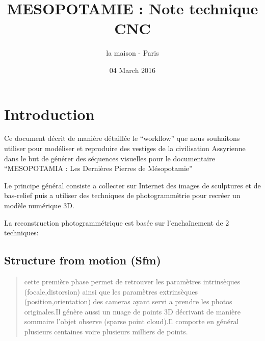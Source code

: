\documentclass[a4paper,10pt,french]{sphinxhowto}
\title{MESOPOTAMIE : Note technique CNC}
\date{04 March 2016}
\author{la maison - Paris}
\begin{document}
\maketitle
\tableofcontents
{}\label{index::doc}



\section{Introduction}
\label{introduction:introduction}\label{introduction:les-dernieres-pierres-de-mesopotamie}\label{introduction::doc}
{\hfill{}\hfill}

Ce document décrit de manière détaillée le ``workflow'' que nous souhaitons utiliser pour modéliser et reproduire des vestiges de la civilisation Assyrienne dans le but de générer des séquences visuelles pour le documentaire ``MESOPOTAMIA : Les Dernières Pierres de Mésopotamie''

Le principe général consiste a collecter sur Internet des images de sculptures et de bas-relief puis a utiliser des techniques de photogrammétrie pour recréer un modèle numérique 3D.

La reconstruction photogrammétrique est basée sur l’enchaînement de 2 techniques:


\subsection{\textbf{Structure from motion (Sfm)}}
\label{introduction:structure-from-motion-sfm}\begin{quote}

cette première phase permet de retrouver les paramètres intrinsèques (focale,distorsion) ainsi que les paramètres extrinsèques (position,orientation) des cameras ayant servi a prendre les photos originales.Il génère aussi un nuage de points 3D décrivant de manière sommaire l'objet observe (sparse point cloud).Il comporte en général plusieurs centaines voire plusieurs milliers de points.
\end{quote}
\end{document}
